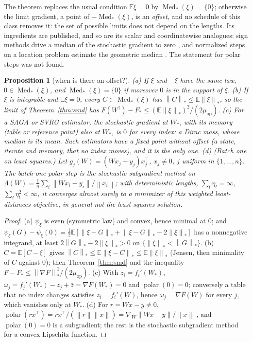 \documentclass[10pt]{article}
\newtheorem{proposition}[theorem]{Proposition}
\theoremstyle{remark}
\newcommand{\E}{\mathbb{E}}
\newcommand{\norm}[1]{\left\|#1\right\|}
\newcommand{\nnuc}[1]{\left\|#1\right\|_{*}}
\newcommand{\polar}{\operatorname{polar}}
\newcommand{\Med}{\operatorname{Med}_\ast}
\newcommand{\muop}{\mu_{\mathrm{op}}}
\begin{document}
The theorem replaces the usual condition $\E\xi=0$ by $\Med(\xi)=\{0\}$; otherwise the limit gradient, a point of
$-\Med(\xi)$, is an \emph{offset}, and no schedule of this class removes it: the set of possible limits does not depend
on the lengths. Its ingredients are published, and so are its scalar and coordinatewise analogues: sign methods drive a median of the stochastic
gradient to zero \cite{chen2020distributed}, and normalized steps on a location problem estimate the geometric median
\cite{cardot2013efficient}. The statement for polar steps was not found.

\begin{proposition}[when is there an offset?]\label{prop:comp}
(a) If $\xi$ and $-\xi$ have the same law, $0\in\Med(\xi)$, and $\Med(\xi)=\{0\}$ if moreover $0$ is in the support
of $\xi$.
(b) If $\xi$ is integrable and $\E\xi=0$, every $C\in\Med(\xi)$ has $\nnuc C\le\E\nnuc\xi$, so the limit of
Theorem~\ref{thm:smd} has $F(W^\dagger)-F_\ast\le(\E\nnuc\xi)^2/(2\muop)$.
(c) For a SAGA or SVRG estimator, the stochastic gradient at $W_\ast$, with its memory (table or reference point) also
at $W_\ast$, is $0$ for every index: a Dirac mass, whose median is its mean. Such estimators have a fixed point
without offset (a state, iterate and memory, that no index moves), and it is the only one.
(d) (Batch one on least squares.) Let $g_j(W)=(Wx_j-y_j)x_j^\top$, $x_j\ne0$, $j$ uniform in $\{1,\dots,n\}$. The
batch-one polar step is the stochastic subgradient method on $\Lambda(W)=\frac1n\sum_i\norm{Wx_i-y_i}/\norm{x_i}$; with
deterministic lengths, $\sum_t\eta_t=\infty$, $\sum_t\eta_t^2<\infty$, it converges almost surely to a minimizer of this
weighted least-distances objective, in general not the least-squares solution.
\end{proposition}
\begin{proof}
(a) $\psi_\xi$ is even (symmetric law) and convex, hence minimal at $0$; and
$\psi_\xi(G)-\psi_\xi(0)=\frac12\E[\nnuc{\xi+G}+\nnuc{\xi-G}-2\nnuc\xi]$ has a nonnegative integrand, at least
$2\nnuc G-2\nnuc\xi>0$ on $\{\nnuc\xi<\nnuc G\}$. (b) $C=\E[C-\xi]$ gives $\nnuc C\le\E\nnuc{\xi-C}\le\E\nnuc\xi$
(Jensen, then minimality of $C$ against $0$); then Theorem~\ref{thm:smd} and the inequality $F-F_\ast\le
\nnuc{\nabla F}^2/(2\muop)$. (c) With $z_i=f_i'(W_\ast)$, $\omega_j=f_j'(W_\ast)-z_j+\bar z=\nabla F(W_\ast)=0$ and
$\polar(0)=0$; conversely a table that no index changes satisfies $z_i=f_i'(W)$, hence $\omega_j=\nabla F(W)$ for every
$j$, which vanishes only at $W_\ast$. (d) For $r=Wx-y\ne0$, $\polar(rx^\top)=rx^\top/(\norm r\norm x)=\nabla_W\norm{Wx-y}/\norm x$
\cite[Lemma~H.1]{li2026implicit}, and $\polar(0)=0$ is a subgradient; the rest is the stochastic subgradient method for a
convex Lipschitz function.
\end{proof}
\end{document}
